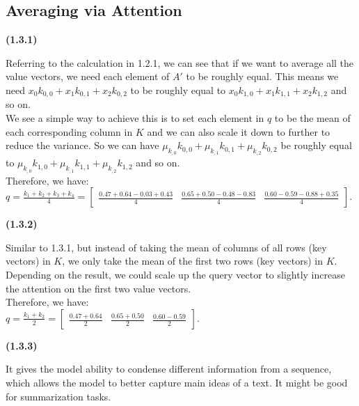 \documentclass{article}
\newcounter{questionCounter}
\newcounter{partCounter}[questionCounter]
\renewenvironment{part}[1][\alph{partCounter}]{%
    \addtocounter{partCounter}{1}%
    \vspace{.10in}%
    \begin{indented}%
       {\bf (#1)} %
}{\end{indented}}
\begin{document}
\subsection{Averaging via Attention}
\begin{part}[1.3.1]
    \begin{answer}
        Referring to the calculation in 1.2.1, we can see that if we want to average all the value vectors, we need each element of $A'$ to be
        roughly equal. This means we need $x_0k_{0,0} + x_1k_{0,1} + x_2k_{0,2}$ to be roughly equal to $x_0k_{1,0} + x_1k_{1,1} + x_2k_{1,2}$ and so on. \\
        We see a simple way to achieve this is to set each element in $q$ to be the mean of each corresponding column in $K$ and we can also scale it down to further
        to reduce the variance. So we can have $\mu_{k_{,0}}k_{0,0} + \mu_{k_{,1}}k_{0,1} + \mu_{k_{,2}}k_{0,2}$ be roughly equal
        to $\mu_{k_{,0}}k_{1,0} + \mu_{k_{,1}}k_{1,1} + \mu_{k_{,2}}k_{1,2}$ and so on.\\

        Therefore, we have:\\ $\boxed{q = \frac{k_1 + k_2 + k_3 + k_4}{4} = \begin{bmatrix}
            \frac{0.47 + 0.64 - 0.03 + 0.43}{4} & \frac{0.65 + 0.50 - 0.48 - 0.83}{4} & \frac{0.60 - 0.59 - 0.88 + 0.35}{4}
        \end{bmatrix}}$. \\
    \end{answer}
 \end{part}

 \begin{part}[1.3.2]
    \begin{answer}
        Similar to 1.3.1, but instead of taking the mean of columns of all rows (key vectors) in $K$, we only take the mean of the first two rows (key vectors) in $K$.
        Depending on the result, we could scale up the query vector to slightly  increase the attention on the first two value vectors. \\
        Therefore, we have:\\ $\boxed{q = \frac{k_1 + k_2}{2} = \begin{bmatrix}
            \frac{0.47 + 0.64}{2} & \frac{0.65 + 0.50}{2} & \frac{0.60 - 0.59}{2}
        \end{bmatrix}}$. \\
     \end{answer}
 \end{part}
\newpage
 \begin{part}[1.3.3]
    \begin{answer}
        It gives the model ability to condense different information from a sequence, which allows the model to
        better capture main ideas of a text. It might be good for summarization tasks.
     \end{answer}
 \end{part}
\end{document}
